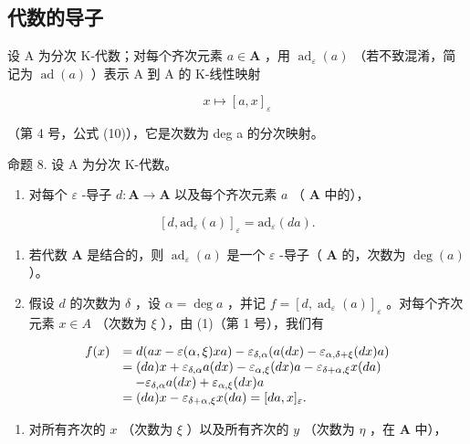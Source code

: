 \subsection{代数的导子}

设 A 为分次 K-代数；对每个齐次元素 \(a \in \mathbf{A}\) ，用 \(\operatorname{ad}_{\varepsilon}(a)\) （若不致混淆，简记为 \(\operatorname{ad}(a)\) ）表示 A 到 A 的 K-线性映射

\[
x \mapsto [ a, x ] _ {\varepsilon}
\]

（第 4 号，公式 (10)），它是次数为 deg a 的分次映射。

命题 8. 设 A 为分次 K-代数。

\begin{enumerate}
\def\labelenumi{(\roman{enumi})}
\tightlist
\item
  对每个 \(\varepsilon\) -导子 \(d: \mathbf{A} \to \mathbf{A}\) 以及每个齐次元素 \(a\) （ \(\mathbf{A}\) 中的），
\end{enumerate}

\[
[ d, \mathrm{ad} _ {\varepsilon} (a) ] _ {\varepsilon} = \mathrm{ad} _ {\varepsilon} (d a).\tag{24}
\]

\begin{enumerate}
\def\labelenumi{(\roman{enumi})}
\setcounter{enumi}{1}
\item
  若代数 \(\mathbf{A}\) 是结合的，则 \(\operatorname{ad}_{\varepsilon}(a)\) 是一个 \(\varepsilon\) -导子（ \(\mathbf{A}\) 的，次数为 \(\deg(a)\) ）。
\item
  假设 \(d\) 的次数为 \(\delta\) ，设 \(\alpha = \deg a\) ，并记 \(f = [d, \operatorname{ad}_{\varepsilon}(a)]_{\varepsilon}\) 。对每个齐次元素 \(x \in A\) （次数为 \(\xi\) ），由 (1)（第 1 号），我们有
\end{enumerate}

\[
\begin{array}{r l} f (x) & = d (a x - \varepsilon (\alpha , \xi) x a) - \varepsilon_ {\delta , \alpha} (a (d x) - \varepsilon_ {\alpha , \delta + \xi} (d x) a) \\ & = (d a) x + \varepsilon_ {\delta , \alpha} a (d x) - \varepsilon_ {\alpha , \xi} (d x) a - \varepsilon_ {\delta + \alpha , \xi} x (d a) \\ & \quad - \varepsilon_ {\delta , \alpha} a (d x) + \varepsilon_ {\alpha , \xi} (d x) a \\ & = (d a) x - \varepsilon_ {\delta + \alpha , \xi} x (d a) = [ d a, x ] _ {\varepsilon}. \end{array}
\]

\begin{enumerate}
\def\labelenumi{(\roman{enumi})}
\setcounter{enumi}{1}
\tightlist
\item
  对所有齐次的 \(x\) （次数为 \(\xi\) ）以及所有齐次的 \(y\) （次数为 \(\eta\) ，在 \(\mathbf{A}\) 中），
\end{enumerate}

